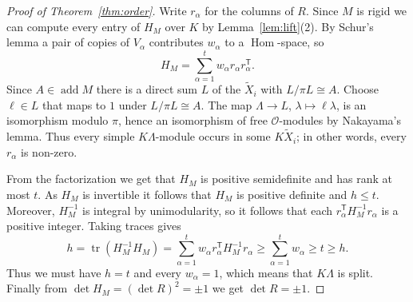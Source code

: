 \documentclass[11pt,a4paper,reqno]{amsart}
\theoremstyle{definition}
\DeclareMathOperator{\Hom}{Hom}
\DeclareMathOperator{\add}{add}
\newcommand{\OO}{\mathcal O}
\begin{document}
\begin{proof}[Proof of Theorem~\ref{thm:order}]
  Write $r_{\alpha}$ for the columns of $R$.  Since $M$ is rigid we
  can compute every entry of $H_{M}$ over $K$ by
  Lemma~\ref{lem:lift}(2).  By Schur's lemma a pair of copies of
  $V_{\alpha}$ contributes $w_{\alpha}$ to a $\Hom$-space, so
  \begin{equation*}
    H_{M}=\sum_{\alpha=1}^{t}w_{\alpha}r_{\alpha}r_{\alpha}^{\mathsf T}.
  \end{equation*}
  Since $A\in\add M$ there is a direct sum $L$ of the
  $\widetilde X_{i}$ with $L/\pi L\cong A$.  Choose $\ell\in L$ that
  maps to $1$ under $L/\pi L\cong A$.  The map $\Lambda\to L$,
  $\lambda\mapsto\ell\lambda$, is an isomorphism modulo $\pi$, hence
  an isomorphism of free $\OO$-modules by Nakayama's lemma.  Thus
  every simple $K\Lambda$-module occurs in some $K\widetilde X_{i}$;
  in other words, every $r_{\alpha}$ is non-zero.

  From the factorization we get that $H_{M}$ is positive semidefinite
  and has rank at most $t$.  As $H_{M}$ is invertible it follows that
  $H_{M}$ is positive definite and $h\leq t$.  Moreover, $H_{M}^{-1}$
  is integral by unimodularity, so it follows that each
  $r_{\alpha}^{\mathsf T}H_{M}^{-1}r_{\alpha}$ is a positive integer.
  Taking traces gives
  \begin{equation*}
    h=\operatorname{tr}(H_{M}^{-1}H_{M})
    =\sum_{\alpha=1}^{t}w_{\alpha}r_{\alpha}^{\mathsf T}H_{M}^{-1}r_{\alpha}
    \geq\sum_{\alpha=1}^{t}w_{\alpha}\geq t\geq h.
  \end{equation*}
  Thus we must have $h=t$ and every $w_{\alpha}=1$, which means that
  $K\Lambda$ is split.  Finally from $\det H_{M}=(\det R)^{2}=\pm1$ we
  get $\det R=\pm1$.
\end{proof}
\end{document}
